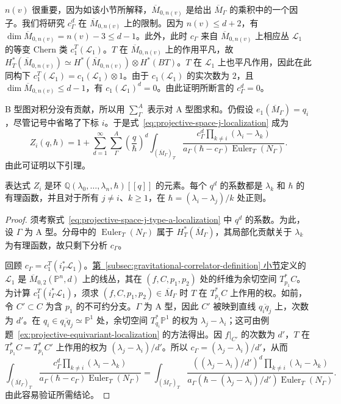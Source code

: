 $n(v)$ 很重要，因为如该小节所解释，$\overline M_{0,n(v)}$ 是给出 $\overline M_\Gamma$ 的乘积中的一个因子。我们将研究 $c_\Gamma^d$ 在 $\overline M_{0,n(v)}$ 上的限制。因为 $n(v)\le d+2$，有 $\dim\overline M_{0,n(v)}=n(v)-3\le d-1$。此外，此时 $c_\Gamma$ 来自 $\overline M_{0,n(v)}$ 上相应丛 $\mathcal L_1$ 的等变 Chern 类 $c_1^T(\mathcal L_1)$。$T$ 在 $\overline M_{0,n(v)}$ 上的作用平凡，故 $H_T^*(\overline M_{0,n(v)})\simeq H^*(\overline M_{0,n(v)})\otimes H^*(BT)$。$T$ 在 $\mathcal L_1$ 上也平凡作用，因此在此同构下 $c_1^T(\mathcal L_1)=c_1(\mathcal L_1)\otimes1$。由于 $c_1(\mathcal L_1)$ 的实次数为 $2$，且 $\dim\overline M_{0,n(v)}\le d-1$，有 $c_1(\mathcal L_1)^d=0$。由此证明所断言的 $c_\Gamma^d=0$。

B 型图对积分没有贡献，所以用 $\sum_\Gamma^A$ 表示对 A 型图求和。仍假设 $e_1(\overline M_\Gamma)=q_i$，尽管记号中省略了下标 $i$。于是式~\eqref{eq:projective-space-j-localization} 成为
\begin{equation}\label{eq:projective-space-j-type-a-localization}
Z_i(q,\hbar)=1+\sum_{d=1}^{\infty}\sum_\Gamma^A\left(\frac q\hbar\right)^d
\int_{(\overline M_\Gamma)_T}\frac{c_\Gamma^d\prod_{k\ne i}(\lambda_i-\lambda_k)}{a_\Gamma(\hbar-c_\Gamma)\operatorname{Euler}_T(N_\Gamma)}.
\end{equation}
由此可证明以下引理。
\begin{lemma}\label{lem:projective-space-j-regularity}
表达式 $Z_i$ 是环 $\mathbb Q(\lambda_0,\ldots,\lambda_n,\hbar)[[q]]$ 的元素。每个 $q^d$ 的系数都是 $\lambda_k$ 和 $\hbar$ 的有理函数，并且对于所有 $j\ne i$、$k\ge1$，在 $\hbar=(\lambda_i-\lambda_j)/k$ 处正则。
\end{lemma}
\begin{proof}
须考察式~\eqref{eq:projective-space-j-type-a-localization} 中 $q^d$ 的系数。为此，设 $\Gamma$ 为 A 型。分母中的 $\operatorname{Euler}_T(N_\Gamma)$ 属于 $H_T^*(\overline M_\Gamma)$，其局部化贡献关于 $\lambda_k$ 为有理函数，故只剩下分析 $c_\Gamma$。

回顾 $c_\Gamma=c_1^T(i_\Gamma^*\mathcal L_1)$。\hyperref[subsec:gravitational-correlator-definition]{第~\ref*{subsec:gravitational-correlator-definition} 小节}定义的 $\mathcal L_1$ 是 $\overline M_{0,2}(\mathbb P^n,d)$ 上的线丛，其在 $(f,C,p_1,p_2)$ 处的纤维为余切空间 $T_{p_1}^*C$。为计算 $c_1^T(i_\Gamma^*\mathcal L_1)$，须求 $(f,C,p_1,p_2)\in\overline M_\Gamma$ 时 $T$ 在 $T_{p_1}^*C$ 上作用的权。如前，令 $C'\subset C$ 为含 $p_1$ 的不可约分支。$\Gamma$ 为 A 型，因此 $C'$ 被映到直线 $\overline{q_iq_j}$ 上，次数为 $d'$。在 $q_i\in\overline{q_iq_j}\simeq\mathbb P^1$ 处，余切空间 $T_{q_i}^*\mathbb P^1$ 的权为 $\lambda_j-\lambda_i$；这可由例题~\ref{ex:projective-equivariant-localization} 的方法得出。因 $f|_{C'}$ 的次数为 $d'$，$T$ 在 $T_{p_1}^*C=T_{p_1}^*C'$ 上作用的权为 $(\lambda_j-\lambda_i)/d'$。所以 $c_\Gamma=(\lambda_j-\lambda_i)/d'$，从而
\[
\int_{(\overline M_\Gamma)_T}\frac{c_\Gamma^d\prod_{k\ne i}(\lambda_i-\lambda_k)}{a_\Gamma(\hbar-c_\Gamma)\operatorname{Euler}_T(N_\Gamma)}
=\int_{(\overline M_\Gamma)_T}\frac{((\lambda_j-\lambda_i)/d')^d\prod_{k\ne i}(\lambda_i-\lambda_k)}{a_\Gamma(\hbar-(\lambda_j-\lambda_i)/d')\operatorname{Euler}_T(N_\Gamma)}.
\]
由此容易验证所需结论。
\end{proof}
